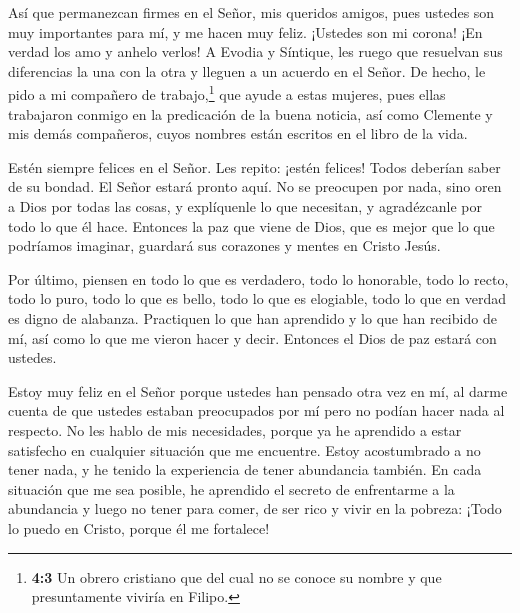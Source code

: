  Así que permanezcan firmes en el Señor, mis queridos
amigos, pues ustedes son muy importantes para mí, y me hacen muy feliz.
¡Ustedes son mi corona! ¡En verdad los amo y anhelo verlos! 
A Evodia y Síntique, les ruego que resuelvan sus diferencias la una con
la otra y lleguen a un acuerdo en el Señor.  De hecho, le
pido a mi compañero de trabajo,\footnote{\textbf{4:3} Un obrero
  cristiano que del cual no se conoce su nombre y que presuntamente
  viviría en Filipo.} que ayude a estas mujeres, pues ellas trabajaron
conmigo en la predicación de la buena noticia, así como Clemente y mis
demás compañeros, cuyos nombres están escritos en el libro de la vida.

 Estén siempre felices en el Señor. Les repito: ¡estén
felices!  Todos deberían saber de su bondad. El Señor estará
pronto aquí.  No se preocupen por nada, sino oren a Dios por
todas las cosas, y explíquenle lo que necesitan, y agradézcanle por todo
lo que él hace.  Entonces la paz que viene de Dios, que es
mejor que lo que podríamos imaginar, guardará sus corazones y mentes en
Cristo Jesús.

 Por último, piensen en todo lo que es verdadero, todo lo
honorable, todo lo recto, todo lo puro, todo lo que es bello, todo lo
que es elogiable, todo lo que en verdad es digno de alabanza.
 Practiquen lo que han aprendido y lo que han recibido de
mí, así como lo que me vieron hacer y decir. Entonces el Dios de paz
estará con ustedes.

 Estoy muy feliz en el Señor porque ustedes han pensado
otra vez en mí, al darme cuenta de que ustedes estaban preocupados por
mí pero no podían hacer nada al respecto.  No les hablo de
mis necesidades, porque ya he aprendido a estar satisfecho en cualquier
situación que me encuentre.  Estoy acostumbrado a no tener
nada, y he tenido la experiencia de tener abundancia también. En cada
situación que me sea posible, he aprendido el secreto de enfrentarme a
la abundancia y luego no tener para comer, de ser rico y vivir en la
pobreza:  ¡Todo lo puedo en Cristo, porque él me fortalece!

